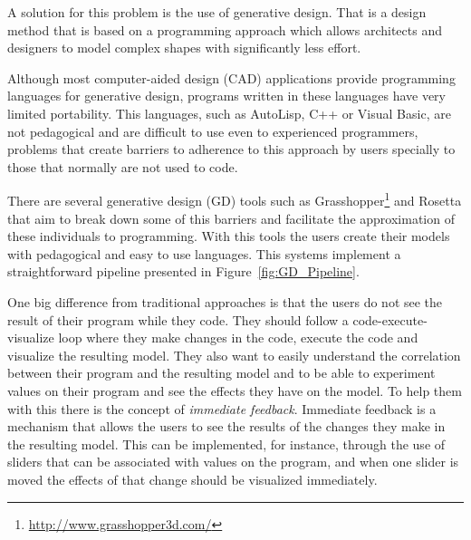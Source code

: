 A solution for this problem is the use of generative design. That is a design method that is based on a programming approach which allows architects and designers to model complex shapes with significantly less effort. 

Although most computer-aided design (CAD) applications provide programming languages for generative design, programs written in these languages have very limited portability. This languages, such as AutoLisp, C++ or Visual Basic, are not pedagogical and are difficult to use even to experienced programmers, problems that create barriers to adherence to this approach by users specially to those that normally are not used to code.\cite{ramos_et_al:OASIcs:2014:4565}

There are several generative design (GD) tools such as Grasshopper\footnote{\url{http://www.grasshopper3d.com/}} and Rosetta that aim to break down some of this barriers and facilitate the approximation of these individuals to programming. With this tools the users create their models with pedagogical and easy to use languages. This systems implement a straightforward pipeline presented in Figure~\ref{fig:GD_Pipeline}. 

One big difference from traditional approaches is that the users do not see the result of their program while they code. They should follow a code-execute-visualize loop where they make changes in the code, execute the code and visualize the resulting model. They also want to easily understand the correlation between their program and the resulting model and to be able to experiment values on their program and see the effects they have on the model. To help them with this there is the concept of \emph{immediate feedback}. Immediate feedback is a mechanism that allows the users to see the results of the changes they make in the resulting model. This can be implemented, for instance, through the use of sliders that can be associated with values on the program, and when one slider is moved the effects of that change should be visualized immediately. 


